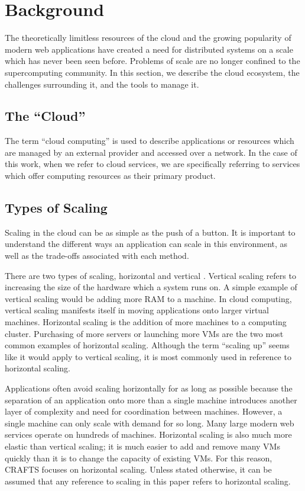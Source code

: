 \chapter{Background}
\label{ch:background}
The theoretically limitless resources of the cloud and the growing popularity of modern web applications have created a need for distributed systems on a scale which has never been seen before. Problems of scale are no longer confined to the supercomputing community. In this section, we describe the cloud ecosystem, the challenges surrounding it, and the tools to manage it.

\section{The ``Cloud''}
The term ``cloud computing'' is used to describe applications or resources which are managed by an external provider and accessed over a network. In the case of this work, when we refer to cloud services, we are specifically referring to services which offer computing resources as their primary product.

\section{Types of Scaling}
Scaling in the cloud can be as simple as the push of a button. It is important to understand the different ways an application can scale in this environment, as well as the trade-offs associated with each method.

There are two types of scaling, horizontal and vertical \cite{allspaw2008art}. Vertical scaling refers to increasing the size of the hardware which a system runs on. A simple example of vertical scaling would be adding more RAM to a machine. In cloud computing, vertical scaling manifests itself in moving applications onto larger virtual machines. Horizontal scaling is the addition of more machines to a computing cluster. Purchasing of more servers or launching more VMs are the two most common examples of horizontal scaling. Although the term ``scaling up'' seems like it would apply to vertical scaling, it is most commonly used in reference to horizontal scaling.

Applications often avoid scaling horizontally for as long as possible because the separation of an application onto more than a single machine introduces another layer of complexity and need for coordination between machines. However, a single machine can only scale with demand for so long. Many large modern web services operate on hundreds of machines. Horizontal scaling is also much more elastic than vertical scaling; it is much easier to add and remove many VMs quickly than it is to change the capacity of existing VMs. For this reason, CRAFTS focuses on horizontal scaling. Unless stated otherwise, it can be assumed that any reference to scaling in this paper refers to horizontal scaling.

